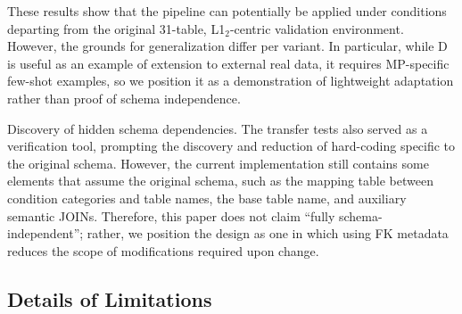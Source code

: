 These results show that the pipeline can potentially be applied under conditions departing from the original 31-table, L1$_2$-centric validation environment. However, the grounds for generalization differ per variant. In particular, while D is useful as an example of extension to external real data, it requires MP-specific few-shot examples, so we position it as a demonstration of lightweight adaptation rather than proof of schema independence.

Discovery of hidden schema dependencies.
The transfer tests also served as a verification tool, prompting the discovery and reduction of hard-coding specific to the original schema. However, the current implementation still contains some elements that assume the original schema, such as the mapping table between condition categories and table names, the base table name, and auxiliary semantic JOINs. Therefore, this paper does not claim ``fully schema-independent''; rather, we position the design as one in which using FK metadata reduces the scope of modifications required upon change.


\subsection{Details of Limitations}
\label{sec:sup_limitations}

